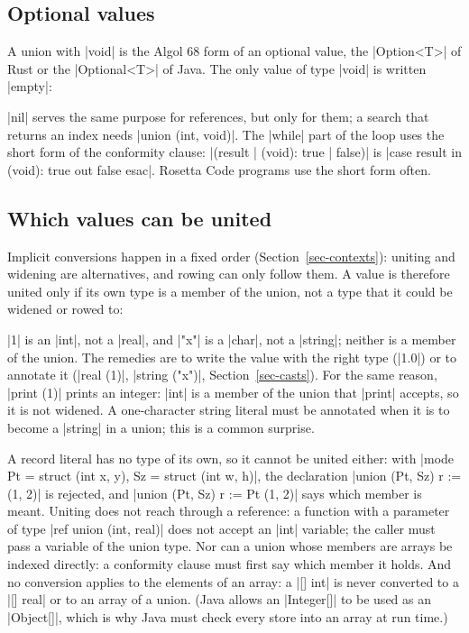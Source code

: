 \subsection*{Optional values}

A union with \code|void| is the Algol 68 form of an optional value, the
\code|Option<T>| of Rust or the \code|Optional<T>| of Java. The only value
of type \code|void| is written \code|empty|:


\code|nil| serves the same purpose for references, but only for them; a
search that returns an index needs \code|union (int, void)|. The
\code|while| part of the loop uses the short form of the conformity
clause: \code|(result | (void): true | false)| is
\code|case result in (void): true out false esac|. Rosetta Code
programs use the short form often.

\subsection*{Which values can be united}

Implicit conversions happen in a fixed order (Section~\ref{sec-contexts}):
uniting and widening are alternatives, and rowing can only follow them.
A value is therefore united only if its own type is a member of the
union, not a type that it could be widened or rowed to:



\code|1| is an \code|int|, not a \code|real|, and \code|"x"| is a
\code|char|, not a \code|string|; neither is a member of the union. The
remedies are to write the value with the right type (\code|1.0|) or to
annotate it (\code|real (1)|, \code|string ("x")|,
Section~\ref{sec-casts}). For the same reason, \code|print (1)| prints an
integer: \code|int| is a member of the union that \code|print| accepts,
so it is not widened. A one-character string literal must be annotated
when it is to become a \code|string| in a union; this is a common
surprise.

A record literal has no type of its own, so it cannot be united either:
with \code|mode Pt = struct (int x, y), Sz = struct (int w, h)|, the
declaration \code|union (Pt, Sz) r := (1, 2)| is rejected, and
\code|union (Pt, Sz) r := Pt (1, 2)| says which member is meant.
Uniting does not reach through a reference: a function with a
parameter of type \code|ref union (int, real)| does not accept an
\code|int| variable; the caller must pass a variable of the union type. Nor can a union whose
members are arrays be indexed directly: a conformity clause must first
say which member it holds. And no
conversion applies to the elements of an array: a \code|[] int| is never
converted to a \code|[] real| or to an array of a union. (Java allows an
\code|Integer[]| to be used as an \code|Object[]|, which is why Java must
check every store into an array at run time.)

